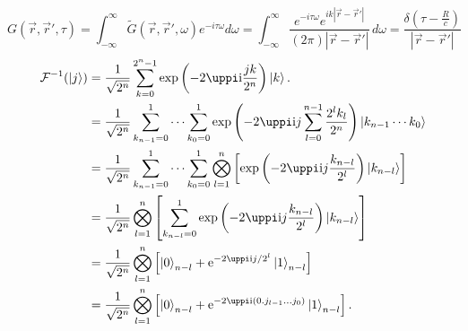 \documentclass { article }
\begin{document}
\[G(\vec{r},{\vec{r}}',\tau )=\int _{-\infty }^{\infty }\tilde{G}(\vec{r},{\vec{r}}',\omega )e^{-i \tau  \omega }d\omega=\int_{-\infty }^{\infty } \frac{e^{-i \tau  \omega } e^{i k |\vec{r}-{\vec{r}}'| }}{(2 \pi ) |\vec{r}-{\vec{r}}'| } \, d\omega=\frac{\delta  \left(\tau -\frac{R}{c}\right)}{|\vec{r}-{\vec{r}}'| }\]
\[
\begin{split}	
\mathcal{F}^{-1}(\ket{j})
&{}=\frac{1}{\sqrt{2^n}}\sum_{k=0}^{2^n-1}\exp\left(-2\uppi \ii \frac{jk}{2^n}\right)\ket{k}.\\
&{}=\frac{1}{\sqrt{2^n}}\sum_{k_{n-1}=0}^1\cdots\sum_{k_{0}=0}^1\exp\left(-2\uppi \ii j\sum_{l=0}^{n-1}\frac{2^l k_l}{2^n}\right)\ket{k_{n-1}\cdots k_0}\\
&{}=\frac{1}{\sqrt{2^n}}\sum_{k_{n-1}=0}^1\cdots\sum_{k_{0}=0}^1\bigotimes_{l=1}^n\left[\exp\left(-2\uppi \ii j\frac{k_{n-l}}{2^l}\right)\ket{k_{n-l}}\right]\\
&{}=\frac{1}{\sqrt{2^n}}\bigotimes_{l=1}^n\left[\sum_{k_{n-l}=0}^1\exp\left(-2\uppi \ii j\frac{k_{n-l}}{2^l}\right)\ket{k_{n-l}}\right]\\
&{}=\frac{1}{\sqrt{2^n}}\bigotimes_{l=1}^n\left[\ket{0}_{n-l}+\ee^{-2\uppi \ii j /2^l}\ket{1}_{n-l}\right]\\
&{}=\frac{1}{\sqrt{2^n}}\bigotimes_{l=1}^n\left[\ket{0}_{n-l}+\ee^{-2\uppi \ii ({0.j_{l-1}\ldots j_0})}\ket{1}_{n-l}\right].
\end{split}
\]

\newcommand{\lb}{\left(}
\newcommand{\rb}{\right)}
\newcommand{\ec}{\text{,}}
\newcommand{\ed}{\text{.}}
\newcommand{\bt}{\lb t\rb}
\newcommand{\deltaup}{\updelta}
\newcommand{\piup}{\uppi}
\newcommand{\ndd}{\,\mathrm{d}}
\end{document}
